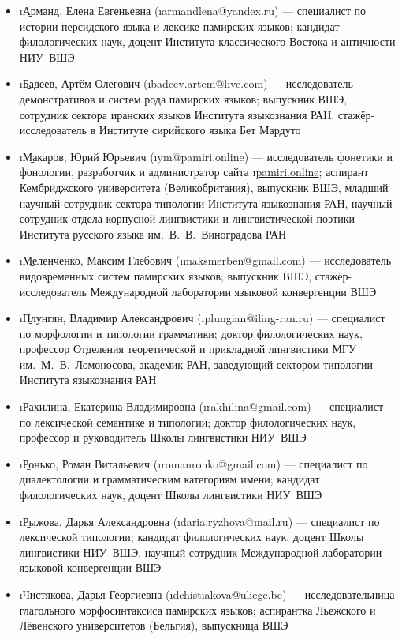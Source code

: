 {\small
\begin{itemize}
  \item \i{\b{Арманд}, Елена Евгеньевна} (\i{armandlena@yandex.ru}) — специалист по истории персидского языка и лексике памирских языков; кандидат филологических наук, доцент Института классического Востока и античности НИУ~ВШЭ
  \item \i{\b{Бадеев}, Артём Олегович} (\i{badeev.artem@live.com}) — исследователь демонстративов и систем рода памирских языков; выпускник ВШЭ, сотрудник сектора иранских языков Института языкознания РАН, стажёр-исследователь в Институте сирийского языка Бет Мардуто
  \item \i{\b{Макаров}, Юрий Юрьевич} (\i{ym@pamiri.online}) — исследователь фонетики и фонологии, разработчик и администратор сайта \i{\href{https://pamiri.online}{pamiri.online}}; аспирант Кембриджского университета (Великобритания), выпускник ВШЭ, младший научный сотрудник сектора типологии Института языкознания РАН, научный сотрудник отдела корпусной лингвистики и лингвистической поэтики Института русского языка им.~В.~В.~Виноградова РАН
  \item \i{\b{Меленченко}, Максим Глебович} (\i{maksmerben@gmail.com}) — исследователь видовременных систем памирских языков; выпускник ВШЭ, стажёр-исследователь Международной лаборатории языковой конвергенции ВШЭ
  \item \i{\b{Плунгян}, Владимир Александрович} (\i{plungian@iling-ran.ru}) — специалист по морфологии и типологии грамматики; доктор филологических наук, профессор Отделения теоретической и прикладной лингвистики МГУ им.~М.~В.~Ломоносова, академик РАН, заведующий сектором типологии Института языкознания РАН
  \item \i{\b{Рахилина}, Екатерина Владимировна} (\i{rakhilina@gmail.com}) — специалист по лексической семантике и типологии; доктор филологических наук, профессор и руководитель Школы лингвистики НИУ~ВШЭ
  \item \i{\b{Ронько}, Роман Витальевич} (\i{romanronko@gmail.com}) — специалист по диалектологии и грамматическим категориям имени; кандидат филологических наук, доцент Школы лингвистики НИУ~ВШЭ
  \item \i{\b{Рыжова}, Дарья Александровна} (\i{daria.ryzhova@mail.ru}) — специалист по лексической типологии; кандидат филологических наук, доцент Школы лингвистики НИУ~ВШЭ, научный сотрудник Международной лаборатории языковой конвергенции ВШЭ
  \item \i{\b{Чистякова}, Дарья Георгиевна} (\i{dchistiakova@uliege.be}) — исследовательница глагольного морфосинтаксиса памирских языков; аспирантка Льежского и Лёвенского университетов (Бельгия), выпускница ВШЭ
\end{itemize}}

